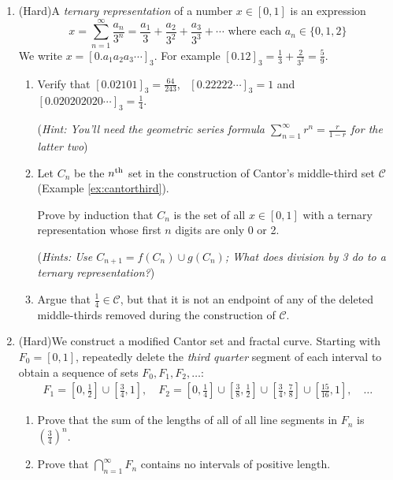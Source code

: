 \begin{exercises}{}{}
\begin{enumerate}
			
		\item\label{exs:cantorset} (Hard)\lstsp A \emph{ternary representation}\footnotemark{} of a number $x\in[0,1]$ is an expression
		\[
			x=\sum\limits_{n=1}^\infty \frac{a_n}{3^n}
			=\frac{a_1}{3}+\frac{a_2}{3^2}+\frac{a_3}{3^3}+\cdots 
			\text{ where each }a_n\in\{0,1,2\}
		\]
		We write $x=[0.a_1a_2a_3\cdots]_3$. For example $[0.12]_3=\frac 13+\frac 2{3^2}=\frac 59$.
		\begin{enumerate}
		  \item Verify that $[0.02101]_3=\frac{64}{243}$, \ $[0.22222\cdots]_3=1$ and $[0.020202020\cdots]_3=\frac 14$.\par
		  (\emph{Hint: You'll need the geometric series formula $\sum_{n=1}^\infty r^n=\frac r{1-r}$ for the latter two})
		  
		  \item Let $C_n$ be the $n\textsuperscript{th}$ set in the construction of Cantor's middle-third set $\mathcal C$ (Example \ref{ex:cantorthird}).\par
		  Prove by induction that $C_n$ is the set of all $x\in[0,1]$ with a ternary representation whose first $n$ digits are only 0 or 2.\par
		  (\emph{Hints: Use $C_{n+1}=f(C_n)\cup g(C_n)$; What does division by 3 do to a ternary representation?})
		  	  
		  \item Argue that $\frac 14\in\mathcal C$, but that it is not an endpoint of any of the deleted middle-thirds removed during the construction of $\mathcal C$.
		\end{enumerate}
		
		
		\item\label{exs:modsnowflake} (Hard)\lstsp We construct a modified Cantor set and fractal curve. Starting with $F_0=[0,1]$, repeatedly delete the \emph{third quarter} segment of each interval to obtain a sequence of sets $F_0,F_1,F_2,\ldots$:
	  \begin{gather*}  
	  	F_1=[0,\tfrac 12]\cup[\tfrac 34,1],\quad
	  	F_2=[0,\tfrac 14]\cup[\tfrac 38,\tfrac 12]
	  	\cup[\tfrac 34,\tfrac 78]\cup[\tfrac{15}{16},1],\quad \ldots
	  \end{gather*}
	  \begin{enumerate}
	    \item Prove that the sum of the lengths of all of all line segments in $F_n$ is $\left(\frac 34\right)^n$.
	    \item Prove that $\bigcap_{n=1}^\infty F_n$ contains no intervals of positive length.
	    

\end{enumerate}
\end{enumerate}
\end{exercises}
